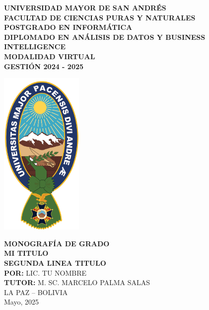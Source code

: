 \documentclass[11pt,oneside,letterpaper]{book}
\begin{document}
	\thispagestyle{empty}
	\begin{center}
		\Large{\textbf{UNIVERSIDAD MAYOR DE SAN ANDRÉS}} \\
		\large{\textbf{FACULTAD DE CIENCIAS PURAS Y NATURALES}} \\
		\large{\textbf{POSTGRADO EN INFORMÁTICA}} \\
		\vspace{0.5cm}
		\large{\textbf{DIPLOMADO EN ANÁLISIS DE DATOS Y BUSINESS INTELLIGENCE}} \\
		\vspace{0.5cm}
            \large{\textbf{MODALIDAD VIRTUAL}} \\
		\large{\textbf{GESTIÓN 2024 - 2025}} \\
		\begin{center}
			\includegraphics[width=4cm]{logo_umsa.png}
		\end{center}
		\vspace{0.5cm}
		\large{\textbf{MONOGRAFÍA DE GRADO}} \\
		\vspace{0.2cm}
		\large{\textbf{MI TITULO \\
            SEGUNDA LINEA TITULO}} \\
		\vspace{0.5cm}
		\textbf{POR:} LIC. TU NOMBRE \\
		\textbf{TUTOR:} M. SC. MARCELO PALMA SALAS \\
		\vspace{0.5cm}
		LA PAZ – BOLIVIA \\
		Mayo, 2025
	\end{center}

	\newpage
	\thispagestyle{empty}
        \renewcommand{\cftchapdotsep}{\cftdotsep} %
	   	\renewcommand{\contentsname}{ÍNDICE}
        \renewcommand{\cfttoctitlefont}{\large\bfseries}  %
        \tableofcontents
\end{document}
